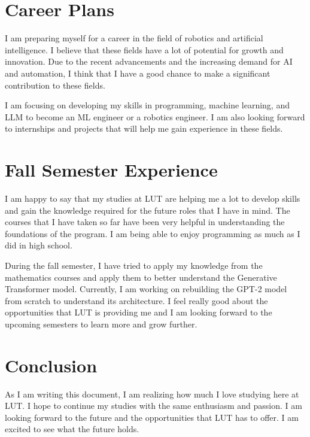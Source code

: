 \documentclass[12pt, titlepage, a4paper]{article}
\begin{document}
\section{Career Plans}
I am preparing myself for a career in the field of robotics and artificial intelligence.
I believe that these fields have a lot of potential for growth and innovation. Due to 
the recent advancements and the increasing demand for AI and automation, I think that 
I have a good chance to make a significant contribution to these fields. 

I am focusing on developing my skills in programming, machine learning, and LLM to 
become an ML engineer or a robotics engineer. I am also looking forward to 
internships and projects that will help me gain experience in these fields.  

\section{Fall Semester Experience}
I am happy to say that my studies at LUT are helping me a lot to develop skills and 
gain the knowledge required for the future roles that I have in mind. The courses 
that I have taken so far have been very helpful in understanding the foundations of 
the program. I am being able to enjoy programming as much as I did in high school. 

During the fall semester, I have tried to apply my knowledge from the mathematics
courses and apply them to better understand the Generative Transformer model. Currently,
I am working on rebuilding the GPT-2 model from scratch to understand its architecture.
I feel really good about the opportunities that LUT is providing me and I am looking
forward to the upcoming semesters to learn more and grow further.

\section{Conclusion}
As I am writing this document, I am realizing how much I love studying here at LUT. I 
hope to continue my studies with the same enthusiasm and passion. I am looking forward
to the future and the opportunities that LUT has to offer. I am excited to see what 
the future holds.
\end{document}
